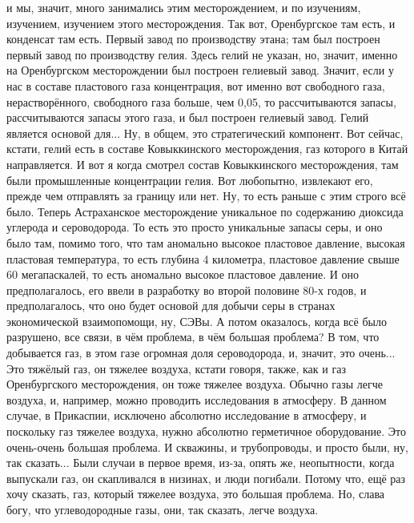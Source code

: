 \documentclass[main.tex]{subfiles}
\begin{document}
и мы, значит, много занимались этим месторождением, и по изучениям, изучением, изучением этого месторождения.
Так вот, Оренбургское там есть, и конденсат там есть.
Первый завод по производству этана; там был построен первый завод по производству гелия.
Здесь гелий не указан, но, значит, именно на Оренбургском месторождении был построен гелиевый завод.
Значит, если у нас в составе пластового газа концентрация, вот именно вот свободного газа, нерастворённого, свободного газа больше, чем 0,05, то рассчитываются запасы, рассчитываются запасы этого газа, и был построен гелиевый завод.
Гелий является основой для...
Ну, в общем, это стратегический компонент.
Вот сейчас, кстати, гелий есть в составе Ковыккинского месторождения, газ которого в Китай направляется.
И вот я когда смотрел состав Ковыккинского месторождения, там были промышленные концентрации гелия.
Вот любопытно, извлекают его, прежде чем отправлять за границу или нет.
Ну, то есть раньше с этим строго всё было.
Теперь Астраханское месторождение уникальное по содержанию диоксида углерода и сероводорода.
То есть это просто уникальные запасы серы, и оно было там, помимо того, что там аномально высокое пластовое давление, высокая пластовая температура, то есть глубина 4 километра, пластовое давление свыше 60 мегапаскалей, то есть аномально высокое пластовое давление.
И оно предполагалось, его ввели в разработку во второй половине 80-х годов, и предполагалось, что оно будет основой для добычи серы в странах экономической взаимопомощи, ну, СЭВы.
А потом оказалось, когда всё было разрушено, все связи, в чём проблема, в чём большая проблема?
В том, что добывается газ, в этом газе огромная доля сероводорода, и, значит, это очень...
Это тяжёлый газ, он тяжелее воздуха, кстати говоря, также, как и газ Оренбургского месторождения, он тоже тяжелее воздуха.
Обычно газы легче воздуха, и, например, можно проводить исследования в атмосферу.
В данном случае, в Прикаспии, исключено абсолютно исследование в атмосферу, и поскольку газ тяжелее воздуха, нужно абсолютно герметичное оборудование.
Это очень-очень большая проблема.
И скважины, и трубопроводы, и просто были, ну, так сказать...
Были случаи в первое время, из-за, опять же, неопытности, когда выпускали газ, он скапливался в низинах, и люди погибали.
Потому что, ещё раз хочу сказать, газ, который тяжелее воздуха, это большая проблема.
Но, слава богу, что углеводородные газы, они, так сказать, легче воздуха.
\end{document}
